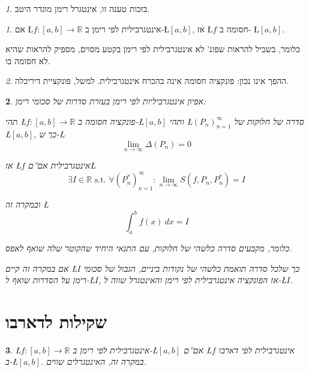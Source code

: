 \documentclass[english,hebrew]{article}
\theoremstyle{remark}
\newtheorem*{rem*}{\protect\remarkname}
\theoremstyle{definition}
\theoremstyle{plain}
\newtheorem{thm}{\protect\theoremname}
\theoremstyle{remark}
\newtheorem{claim}[thm]{\protect\claimname}
\theoremstyle{plain}
\theoremstyle{plain}
\theoremstyle{definition}
\theoremstyle{plain}
\providecommand{\claimname}{טענה}
\providecommand{\remarkname}{הערה}
\providecommand{\theoremname}{משפט}
\begin{document}
\begin{rem*}
בזכות טענה זו, אינטגרל רימן מוגדר היטב.
\end{rem*}
\begin{claim}
\label{claim:riemann-bounded}אם \L{$f:\left[a,b\right]\rightarrow\mathbb{R}$}
אינטגרבילית לפי רימן ב-\L{$\left[a,b\right]$}, אז \L{$f$} חסומה
ב- \L{$\left[a,b\right]$}.

כלומר, בשביל להראות שפונ' לא אינטגרבילית לפי רימן בקטע מסוים, מספיק
להראות שהיא לא חסומה בו. 
\end{claim}

\begin{rem*}
ההפך אינו נכון: פונקציה חסומה אינה בהכרח אינטגרבילית. למשל, פונקציית
דיריכלה.
\end{rem*}
\begin{thm}
אפיון אינטגרביליות לפי רימן בעזרת סדרות של סכומי רימן:

תהי \L{$f:\left[a,b\right]\rightarrow\mathbb{R}$} פונקציה חסומה ב-\L{$\left[a,b\right]$}
ותהי \L{$\left(P_{n}\right)_{n=1}^{\infty}$} סדרה של חלוקות של \L{$\left[a,b\right]$},
כך ש-\L{%
\[
\underset{n\rightarrow\infty}{\lim}\Delta\left(P_{n}\right)=0
\]
}%

אז \L{$f$} אינטגרבילית אם\textquotedblright ם\L{%
\[
\exists I\in\mathbb{R}\text{ s.t. }\forall\left(P_{n}^{*}\right)_{n=1}^{\infty}:\underset{n\rightarrow\infty}{\lim}S\left(f,P_{n},P_{n}^{*}\right)=I
\]
}%

ובמקרה זה \L{%
\[
\int_{a}^{b}f(x)\ dx=I
\]
}%

כלומר, מקבעים סדרה כלשהי של חלוקות, עם התנאי היחיד שהקוטר שלה שואף
לאפס.

אם במקרה זה קיים \L{$I$} כך שלכל סדרה תואמת כלשהי של נקודות ביניים,
הגבול של סכומי רימן על הסדרות שואף ל-\L{$I$}, אז הפונקציה אינטגרבילית
לפי רימן והאינטגרל שווה ל-\L{$I$}.
\end{thm}

\section{שקילות לדארבו}
\begin{thm}
\L{$f:\left[a,b\right]\rightarrow\mathbb{R}$} אינטגרבילית לפי רימן
ב-\L{$\left[a,b\right]$} אם\textquotedblright ם \L{$f$} אינטגרבילית
לפי דארבו ב-\L{$\left[a,b\right]$}. במקרה זה, האינטגרלים שווים. 
\end{thm}
\end{document}
